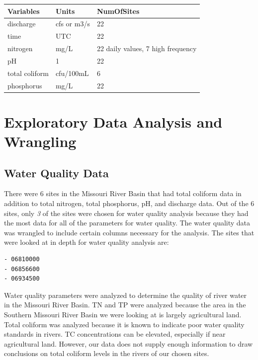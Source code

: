 \documentclass[12pt,]{article}
\begin{document}
\begin{table}[H]
\centering
\begin{tabular}{l|l|l}
\hline
Variables & Units & NumOfSites\\
\hline
discharge & cfs or m3/s & 22\\
\hline
time & UTC & 22\\
\hline
nitrogen & mg/L & 22 daily values, 7 high frequency\\
\hline
pH & 1 & 22\\
\hline
total coliform & cfu/100mL & 6\\
\hline
phosphorus & mg/L & 22\\
\hline
\end{tabular}
\end{table}

\newpage

\hypertarget{exploratory-data-analysis-and-wrangling}{%
\section{Exploratory Data Analysis and
Wrangling}\label{exploratory-data-analysis-and-wrangling}}

\hypertarget{water-quality-data}{%
\subsection{Water Quality Data}\label{water-quality-data}}

There were 6 sites in the Missouri River Basin that had total coliform
data in addition to total nitrogen, total phosphorus, pH, and discharge
data. Out of the 6 sites, only \emph{3} of the sites were chosen for
water quality analysis because they had the most data for all of the
parameters for water quality. The water quality data was wrangled to
include certain columns necessary for the analysis. The sites that were
looked at in depth for water quality analysis are:

\begin{verbatim}
- 06810000
- 06856600
- 06934500
\end{verbatim}

Water quality parameters were analyzed to determine the quality of river
water in the Missouri River Basin. TN and TP were analyzed because the
area in the Southern Missouri River Basin we were looking at is largely
agricultural land. Total coliform was analyzed because it is known to
indicate poor water quality standards in rivers. TC concentrations can
be elevated, especially if near agricultural land. However, our data
does not supply enough information to draw conclusions on total coliform
levels in the rivers of our chosen sites.
\end{document}
